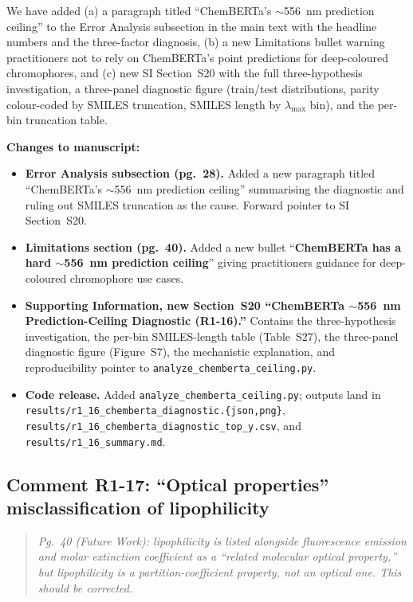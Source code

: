 \documentclass[11pt]{article}
\newenvironment{reviewer}{%
  \begin{quote}\itshape\color{black!70}}{%
  \end{quote}}
\newenvironment{changes}{%
  \noindent\textbf{Changes to manuscript:}
  \begin{itemize}[leftmargin=2em,itemsep=2pt]}{%
  \end{itemize}\medskip}
\begin{document}
{We have added (a) a paragraph titled ``ChemBERTa's $\sim$556~nm prediction ceiling'' to the Error Analysis subsection in the main text with the headline numbers and the three-factor diagnosis, (b) a new Limitations bullet warning practitioners not to rely on ChemBERTa's point predictions for deep-coloured chromophores, and (c) new SI Section~S20 with the full three-hypothesis investigation, a three-panel diagnostic figure (train/test distributions, parity colour-coded by SMILES truncation, SMILES length by $\lambda_{\max}$ bin), and the per-bin truncation table.}

\begin{changes}
  \item \textbf{Error Analysis subsection (pg.\ 28).} Added a new paragraph titled ``ChemBERTa's $\sim$556~nm prediction ceiling'' summarising the diagnostic and ruling out SMILES truncation as the cause. Forward pointer to SI Section~S20.
  \item \textbf{Limitations section (pg.\ 40).} Added a new bullet ``\textbf{ChemBERTa has a hard $\sim$556~nm prediction ceiling}'' giving practitioners guidance for deep-coloured chromophore use cases.
  \item \textbf{Supporting Information, new Section~S20 ``ChemBERTa $\sim$556~nm Prediction-Ceiling Diagnostic (R1-16).''} Contains the three-hypothesis investigation, the per-bin SMILES-length table (Table~S27), the three-panel diagnostic figure (Figure~S7), the mechanistic explanation, and reproducibility pointer to \texttt{analyze\_chemberta\_ceiling.py}.
  \item \textbf{Code release.} Added \texttt{analyze\_chemberta\_ceiling.py}; outputs land in \texttt{results/r1\_16\_chemberta\_diagnostic.\{json,png\}}, \texttt{results/r1\_16\_chemberta\_diagnostic\_top\_y.csv}, and \texttt{results/r1\_16\_summary.md}.
\end{changes}

\clearpage

\subsection*{Comment R1-17: ``Optical properties'' misclassification of lipophilicity}
\begin{reviewer}
Pg.\ 40 (Future Work): lipophilicity is listed alongside fluorescence emission and molar extinction coefficient as a ``related molecular optical property,'' but lipophilicity is a partition-coefficient property, not an optical one. This should be corrected.
\end{reviewer}
\end{document}
